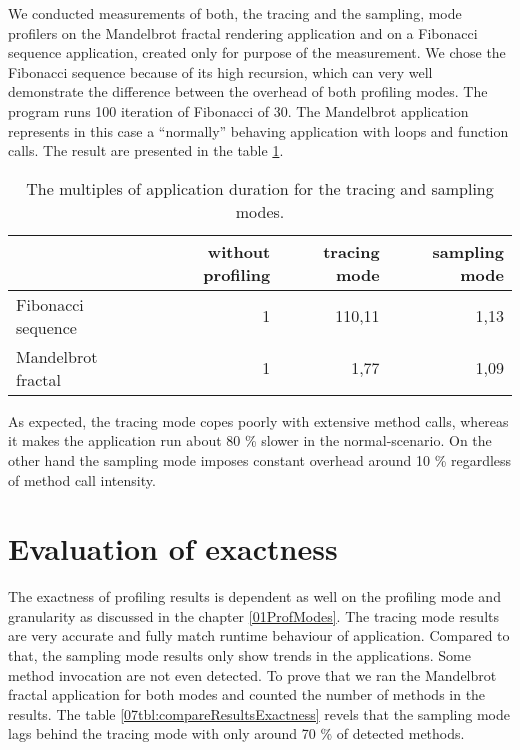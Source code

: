 We conducted measurements of both, the tracing and the sampling, mode profilers on the Mandelbrot fractal rendering application and on a Fibonacci sequence application, created only for purpose of the measurement. We chose the Fibonacci sequence because of its high recursion, which can very well demonstrate the difference between the overhead of both profiling modes. The program runs 100 iteration of Fibonacci of 30. The Mandelbrot application represents in this case a ``normally'' behaving application with loops and function calls. The result are presented in the table \ref{07tbl:compareResults}. 

\begin{table}
\centering
    \begin{tabular}{|l|r|r|r|}
        \hline
        ~                  & without profiling & tracing mode & sampling mode \\ \hline
        Fibonacci sequence & 1                 & 110,11       & 1,13          \\ 
        Mandelbrot fractal & 1                 & 1,77         & 1,09          \\
        \hline
    \end{tabular}
    \caption{The multiples of application duration for the tracing and sampling modes. }
    \label{07tbl:compareResults}
\end{table}
 
As expected, the tracing mode copes poorly with extensive method calls, whereas it makes the application run about 80 \% slower in the normal-scenario. On the other hand the sampling mode imposes constant overhead around 10 \% regardless of method call intensity.

\section{Evaluation of exactness}
The exactness of profiling results is dependent as well on the profiling mode and granularity as discussed in the chapter \ref{01ProfModes}. The tracing mode results are very accurate and fully match runtime behaviour of application. Compared to that, the sampling mode results only show trends in the applications. Some method invocation are not even detected. To prove that we ran the Mandelbrot fractal application for both modes and counted the number of methods in the results. The table \ref{07tbl:compareResultsExactness} revels that the sampling mode lags behind the tracing mode with only around 70 \% of detected methods.

